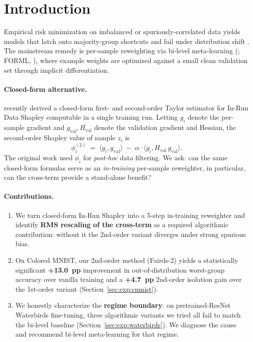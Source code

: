 \section{Introduction}
\label{sec:intro}

Empirical risk minimization on imbalanced or spuriously-correlated data
yields models that latch onto majority-group shortcuts and fail under
distribution shift \citep{sagawa2020groupdro,arjovsky2019irm}. The
mainstream remedy is per-sample reweighting via bi-level meta-learning
(\citealt{ren2018reweight}; FORML, \citealt{yan2022forml}), where
example weights are optimized against a small clean validation set
through implicit differentiation.

\paragraph{Closed-form alternative.}
\citet{wang2024inrun} recently derived a closed-form first- and
second-order Taylor estimator for In-Run Data Shapley computable in a
single training run. Letting $g_i$ denote the per-sample gradient and
$g_{\mathrm{val}}, H_{\mathrm{val}}$ denote the validation gradient and
Hessian, the second-order Shapley value of sample $z_i$ is
\begin{equation}
\phi_i^{(2)} \;=\; \langle g_i, g_{\mathrm{val}}\rangle
\;-\; \alpha \cdot \langle g_i, H_{\mathrm{val}}\, g_{\mathrm{val}}\rangle.
\label{eq:phi2}
\end{equation}
The original work used $\phi_i$ for \emph{post-hoc} data filtering. We
ask: can the same closed-form formulas serve as an \emph{in-training}
per-sample reweighter, in particular, can the cross-term provide a
stand-alone benefit?

\paragraph{Contributions.}
\begin{enumerate}[leftmargin=1.2em, itemsep=2pt, topsep=3pt]
\item We turn closed-form In-Run Shapley into a 5-step in-training
reweighter and identify \textbf{RMS rescaling of the cross-term} as a
required algorithmic contribution: without it the 2nd-order variant
diverges under strong spurious bias.
\item On Colored MNIST, our 2nd-order method (Fairds-2) yields a
statistically significant \textbf{+13.0~pp} improvement in out-of-distribution
worst-group accuracy over vanilla training and a \textbf{+4.7~pp} 2nd-order
isolation gain over the 1st-order variant (Section~\ref{sec:exp:cmnist}).
\item We honestly characterize the \textbf{regime boundary}: on
pretrained-ResNet Waterbirds fine-tuning, three algorithmic variants we
tried all fail to match the bi-level baseline (Section~\ref{sec:exp:waterbirds}).
We diagnose the cause and recommend bi-level meta-learning for that regime.
\end{enumerate}

